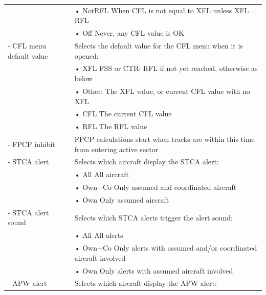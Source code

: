 \documentclass[11pt,a4paper,oldfontcommands]{memoir}
\begin{document}
\begin{tabular}{p{5cm} p{9cm}}
                          & \hspace{10pt}• NotRFL When CFL is not equal to XFL unless XFL = RFL\\
                          & \hspace{10pt}• Off Never, any CFL value is OK\\
- CFL menu default value  & Selects the default value for the CFL menu when it is opened:\\
                          & \hspace{10pt}• XFL FSS or CTR: RFL if not yet reached, otherwise as below\\
                          & \hspace{10pt}• Other: The XFL value, or current CFL value with no XFL\\
                          & \hspace{10pt}• CFL The current CFL value\\
                          & \hspace{10pt}• RFL The RFL value\\
- FPCP inhibit            & FPCP calculations start when tracks are within this time from entering active sector\\
- STCA alert              & Selects which aircraft display the STCA alert:\\
                          & \hspace{10pt}• All All aircraft\\
                          & \hspace{10pt}• Own+Co Only assumed and coordinated aircraft\\
                          & \hspace{10pt}• Own Only assumed aircraft\\
- STCA alert sound        & Selects which STCA alerts trigger the alert sound:\\
                          & \hspace{10pt}• All All alerts\\
                          & \hspace{10pt}• Own+Co Only alerts with assumed and/or coordinated aircraft involved\\
                          & \hspace{10pt}• Own Only alerts with assumed aircraft involved\\
- APW alert               & Selects which aircraft display the APW alert:\\

\end{tabular}
\end{document}

